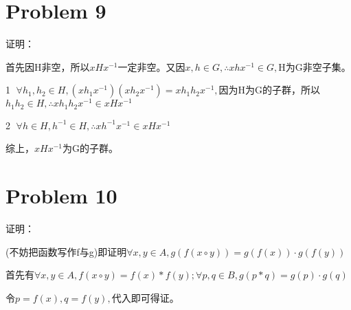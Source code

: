 \documentclass{article}
\begin{document}
\section*{Problem 9}
证明：

首先因H非空，所以$xHx^{-1}$一定非空。又因$x,h\in G,\therefore xhx^{-1}\in G,$H为G非空子集。

\textcircled{1}
$\forall h_{1},h_{2}\in H,(xh_{1}x^{-1})(xh_{2}x^{-1})=xh_{1}h_{2}x^{-1},$因为H为G的子群，所以$h_{1}h_{2}\in H,\therefore xh_{1}h_{2}x^{-1}\in xHx^{-1}$

\textcircled{2}
$\forall h \in H,h^{-1}\in H,\therefore xh^{-1}x^{-1}\in xHx^{-1}$

综上，$xHx^{-1}$为G的子群。

\section*{Problem 10}
证明：

(不妨把函数写作f与g)即证明$\forall x,y\in A,g(f(x\circ y))=g(f(x))\cdot g(f(y))$

首先有$\forall x,y\in A,f(x\circ y)=f(x)*f(y);\forall p,q\in B,g(p*q)=g(p)\cdot g(q)$

令$p=f(x),q=f(y),$代入即可得证。
\end{document}
